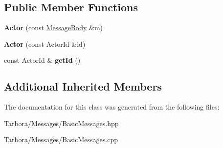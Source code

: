 \subsection*{Public Member Functions}
\begin{DoxyCompactItemize}
\item 
\mbox{\label{classTarbora_1_1Message_1_1Actor_ad87e1dac0017c3c1f10dbcf93642e07b}} 
{\bfseries Actor} (const \hyperlink{classTarbora_1_1MessageBody}{Message\+Body} \&m)
\item 
\mbox{\label{classTarbora_1_1Message_1_1Actor_a27058490217da23f5398da551d3849a7}} 
{\bfseries Actor} (const Actor\+Id \&id)
\item 
\mbox{\label{classTarbora_1_1Message_1_1Actor_a62c0d69a2bfca11efd8d34998d5e1ac5}} 
const Actor\+Id \& {\bfseries get\+Id} ()
\end{DoxyCompactItemize}
\subsection*{Additional Inherited Members}


The documentation for this class was generated from the following files\+:\begin{DoxyCompactItemize}
\item 
Tarbora/\+Messages/Basic\+Messages.\+hpp\item 
Tarbora/\+Messages/Basic\+Messages.\+cpp\end{DoxyCompactItemize}
